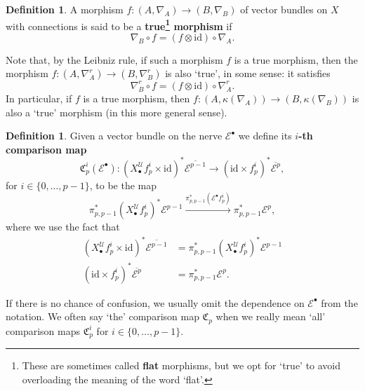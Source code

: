 \documentclass[11pt,fleqn]{article}
\theoremstyle{plain}
\theoremstyle{definition}
\newtheorem{definition}[theorem]{Definition}
\theoremstyle{remark}
\numberwithin{equation}{theorem}
\newcommand{\cover}{\mathcal{U}}
\newcommand{\id}{\mathrm{id}}
\newcommand{\define}[1]{\textbf{#1}}
\newcommand{\nerve}[1]{X_{#1}^\cover}
\newcommand{\comparison}[1]{\mathfrak{C}_{#1}}
\begin{document}
        \begin{definition}\label{definition:true-morphism}
            A morphism $f\colon(A,\nabla_A)\to(B,\nabla_B)$ of vector bundles on $X$ with connections is said to be a \define{true\footnote{These are sometimes called \define{flat} morphisms, but we opt for `true' to avoid overloading the meaning of the word `flat'.} morphism} if
            \[
                \nabla_B\circ f = (f\otimes\id)\circ\nabla_A.
            \]

            Note that, by the Leibniz rule, if such a morphism $f$ is a true morphism, then the morphism $f\colon(A,\nabla_A^r)\to(B,\nabla_B^r)$ is also `true', in some sense: it satisfies
            \[
                \nabla_B^r \circ f = (f\otimes\id) \circ \nabla_A^r.
            \]
            In particular, if $f$ is a true morphism, then $f\colon(A,\kappa(\nabla_A))\to(B,\kappa(\nabla_B))$ is also a `true' morphism (in this more general sense).
        \end{definition}

        \begin{definition}\label{definition:comparison-map}
            Given a vector bundle on the nerve $\mathcal{E}^\bullet$ we define its \define{$i$-th comparison map}
            \[
                \comparison{p}^i(\mathcal{E}^\bullet)
                \colon
                \left(\nerve{\bullet} f_p^i\times\id\right)^*\overline{\mathcal{E}^{p-1}}
                \longrightarrow
                \left(\id\times f_p^i\right)^*\overline{\mathcal{E}^p},
            \]
            for $i\in\{0,\ldots,p-1\}$, to be the map
            \[
                \pi_{p,p-1}^*\left(\nerve{\bullet} f_p^i\right)^*\mathcal{E}^{p-1}
                \xrightarrow{\pi_{p,p-1}^*\left( \mathcal{E}^\bullet f_p^i \right)}
                \pi_{p,p-1}^*\mathcal{E}^p,
            \]
            where we use the fact that
            \begin{align*}
                \left(\nerve{\bullet} f_p^i\times\id\right)^*\overline{\mathcal{E}^{p-1}}
            &   =
                \pi_{p,p-1}^*\left(\nerve{\bullet} f_p^i\right)^*\mathcal{E}^{p-1}
            \\  \left(\id\times f_p^i\right)^*\overline{\mathcal{E}^p}
            &   =
                \pi_{p,p-1}^*\mathcal{E}^p.
            \end{align*}

            If there is no chance of confusion, we usually omit the dependence on $\mathcal{E}^\bullet$ from the notation.
            We often say `the' comparison map $\comparison{p}$ when we really mean `all' comparison maps $\comparison{p}^i$ for $i\in\{0,\ldots,p-1\}$.
        \end{definition}
\end{document}
